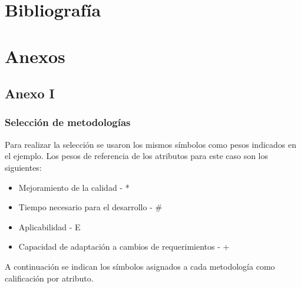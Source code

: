 \documentclass{article}
\begin{document}
\section{Bibliografía}
\printbibliography[heading=none,notcategory=cited]
\section{Anexos}
\subsection{Anexo I}
\subsubsection{Selección de metodologías}
Para realizar la selección se usaron los mismos símbolos como pesos indicados en el ejemplo. Los pesos de referencia de los atributos para este caso son los siguientes:
\begin{itemize}
    \item Mejoramiento de la calidad - *
    \item Tiempo necesario para el desarrollo - \#
    \item Aplicabilidad - E
    \item Capacidad de adaptación a cambios de requerimientos - +
\end{itemize}
A continuación se indican los símbolos asignados a cada metodología como calificación por atributo.
\end{document}

